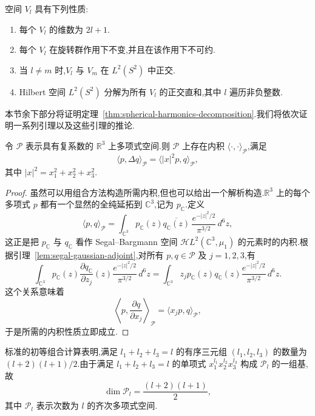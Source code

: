 \begin{theorem}[$L^2(S^2)$ 中球谐函数的分解]\label{thm:spherical-harmonics-decomposition}
空间 $V_l$ 具有下列性质:

\begin{enumerate}
\item 每个 $V_l$ 的维数为 $2l+1$.
\item 每个 $V_l$ 在旋转群作用下不变,并且在该作用下不可约.
\item 当 $l\neq m$ 时,$V_l$ 与 $V_m$ 在 $L^2(S^2)$ 中正交.
\item Hilbert 空间 $L^2(S^2)$ 分解为所有 $V_l$ 的正交直和,其中 $l$ 遍历非负整数.
\end{enumerate}
\end{theorem}

本节余下部分将证明定理~\ref{thm:spherical-harmonics-decomposition}.我们将依次证明一系列引理以及这些引理的推论.

\begin{lemma}[多项式空间上的内积]\label{lem:polynomial-inner-product}
令 $\mathcal P$ 表示具有复系数的 $\mathbb R^3$ 上多项式空间.则 $\mathcal P$ 上存在内积 $\langle\cdot,\cdot\rangle_{\mathcal P}$,满足
\[
 \langle p,\Delta q\rangle_{\mathcal P}=\langle |x|^2p,q\rangle_{\mathcal P},
\]
其中 $|x|^2=x_1^2+x_2^2+x_3^2$.
\end{lemma}

\begin{proof}
虽然可以用组合方法构造所需内积,但也可以给出一个解析构造.$\mathbb R^3$ 上的每个多项式 $p$ 都有一个显然的全纯延拓到 $\mathbb C^3$,记为 $p_{\mathbb C}$.定义
\[
 \langle p,q\rangle_{\mathcal P}
 =\int_{\mathbb C^3}p_{\mathbb C}(z)\overline{q_{\mathbb C}(z)}\,\frac{e^{-|z|^2/2}}{\pi^{3/2}}\,d^6z,
\]
这正是把 $p_{\mathbb C}$ 与 $q_{\mathbb C}$ 看作 Segal--Bargmann 空间 $\mathcal H L^2(\mathbb C^3,\mu_1)$ 的元素时的内积.根据引理~\ref{lem:segal-gaussian-adjoint},对所有 $p,q\in\mathcal P$ 及 $j=1,2,3$,有
\[
 \int_{\mathbb C^3}p_{\mathbb C}(z)\frac{\partial q_{\mathbb C}}{\partial z_j}(z)\frac{e^{-|z|^2/2}}{\pi^{3/2}}\,d^6z
 =\int_{\mathbb C^3}z_jp_{\mathbb C}(z)q_{\mathbb C}(z)\frac{e^{-|z|^2/2}}{\pi^{3/2}}\,d^6z.
\]
这个关系意味着
\[
 \left\langle p,\frac{\partial q}{\partial x_j}\right\rangle_{\mathcal P}
 =\langle x_jp,q\rangle_{\mathcal P},
\]
于是所需的内积性质立即成立.
\end{proof}

标准的初等组合计算表明,满足 $l_1+l_2+l_3=l$ 的有序三元组 $(l_1,l_2,l_3)$ 的数量为 $(l+2)(l+1)/2$.由于满足 $l_1+l_2+l_3=l$ 的单项式 $x_1^{l_1}x_2^{l_2}x_3^{l_3}$ 构成 $\mathcal P_l$ 的一组基,故
\[
 \dim\mathcal P_l=\frac{(l+2)(l+1)}2,
\]
其中 $\mathcal P_l$ 表示次数为 $l$ 的齐次多项式空间.

